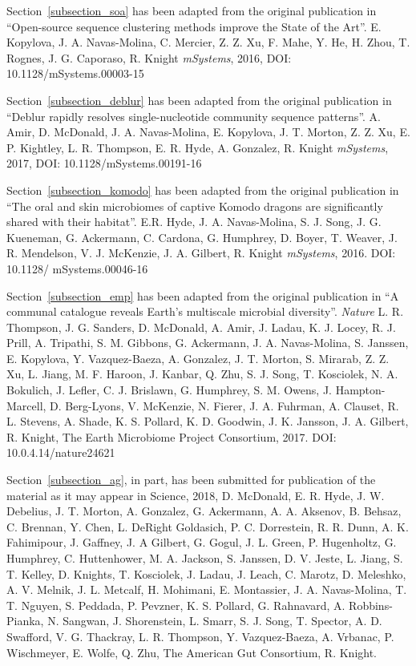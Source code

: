 \begin{frontmatter}
\begin{acknowledgements}
    Section~\ref{subsection_soa} has been adapted from the original publication in
    ``Open-source sequence clustering methods improve the State of the Art''.
    E. Kopylova, J. A. Navas-Molina, C. Mercier, Z. Z. Xu, F. Mahe, Y. He, H. Zhou,
    T. Rognes, J. G. Caporaso, R. Knight \emph{mSystems}, 2016, DOI: 10.1128/mSystems.00003-15

    Section~\ref{subsection_deblur} has been adapted from the original publication in
    ``Deblur rapidly resolves single-nucleotide community sequence patterns''.
    A. Amir, D. McDonald, J. A. Navas-Molina, E. Kopylova, J. T. Morton, Z. Z. Xu,
    E. P. Kightley, L. R. Thompson, E. R. Hyde, A. Gonzalez, R. Knight \emph{mSystems},
    2017, DOI: 10.1128/mSystems.00191-16

    Section~\ref{subsection_komodo} has been adapted from the original publication in
    ``The oral and skin microbiomes of captive Komodo dragons are significantly shared
    with their habitat''. E.R. Hyde, J. A. Navas-Molina, S. J. Song, J. G. Kueneman,
    G. Ackermann, C. Cardona, G. Humphrey, D. Boyer, T. Weaver, J. R. Mendelson,
    V. J. McKenzie, J. A. Gilbert, R. Knight \emph{mSystems}, 2016. DOI: 10.1128/ mSystems.00046-16

    Section~\ref{subsection_emp} has been adapted from the original publication in
    ``A communal catalogue reveals Earth's multiscale microbial diversity''.
    \emph{Nature} L. R. Thompson, J. G. Sanders, D. McDonald, A. Amir,
    J. Ladau, K. J. Locey, R. J. Prill, A. Tripathi, S. M. Gibbons, G. Ackermann,
    J. A. Navas-Molina, S. Janssen, E. Kopylova, Y. Vazquez-Baeza, A. Gonzalez,
    J. T. Morton, S. Mirarab, Z. Z. Xu, L. Jiang, M. F. Haroon, J. Kanbar, Q. Zhu,
    S. J. Song, T. Kosciolek, N. A. Bokulich, J. Lefler, C. J. Brislawn, G. Humphrey,
    S. M. Owens, J. Hampton-Marcell, D. Berg-Lyons, V. McKenzie, N. Fierer, J. A. Fuhrman,
    A. Clauset, R. L. Stevens, A. Shade, K. S. Pollard, K. D. Goodwin, J. K. Jansson,
    J. A. Gilbert, R. Knight, The Earth Microbiome Project Consortium, 2017. DOI: 10.0.4.14/nature24621

    Section~\ref{subsection_ag}, in part, has been submitted for publication of the
    material as it may appear in Science, 2018, D. McDonald, E. R. Hyde, J. W. Debelius,
    J. T. Morton, A. Gonzalez, G. Ackermann, A. A. Aksenov, B. Behsaz, C. Brennan,
    Y. Chen, L. DeRight Goldasich, P. C. Dorrestein, R. R. Dunn, A. K. Fahimipour,
    J. Gaffney, J. A Gilbert, G. Gogul, J. L. Green, P. Hugenholtz, G. Humphrey,
    C. Huttenhower, M. A. Jackson, S. Janssen, D. V. Jeste, L. Jiang, S. T. Kelley,
    D. Knights, T. Kosciolek, J. Ladau, J. Leach, C. Marotz, D. Meleshko, A. V. Melnik,
    J. L. Metcalf, H. Mohimani, E. Montassier, J. A. Navas-Molina, T. T. Nguyen,
    S. Peddada, P. Pevzner, K. S. Pollard, G. Rahnavard, A. Robbins-Pianka,
    N. Sangwan, J. Shorenstein, L. Smarr, S. J. Song, T. Spector, A. D. Swafford,
    V. G. Thackray, L. R. Thompson, Y. Vazquez-Baeza, A. Vrbanac, P. Wischmeyer,
    E. Wolfe, Q. Zhu, The American Gut Consortium, R. Knight.


\end{acknowledgements}
\end{frontmatter}
